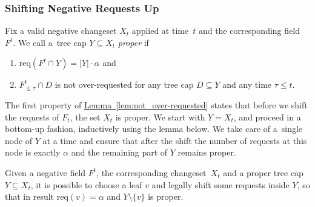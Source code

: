 \documentclass[sigconf,screen=true]{acmart}
\newcommand{\lref}[2][]{\hyperref[#2]{#1~\ref*{#2}}}
\newcommand{\req}{\textrm{req}}
\begin{document}



\subsubsection{Shifting Negative Requests Up}
\label{sec:negative_shifting}
  
Fix a valid negative changeset $X_t$ applied at time~$t$ and the
corresponding field~$F^t$. We call a~tree cap \mbox{$Y \subseteq X_t$} \emph{proper} if
\begin{enumerate}
\item $\req(F^t \cap Y) = |Y| \cdot \alpha$ and
\item $F^t_{\leq \tau} \cap D$ is not over-requested for any tree cap $D \subseteq Y$ and any time 
$\tau \leq t$.
\end{enumerate}

The first property of \lref[Lemma]{lem:not_over-requested} states that before
we shift the requests of $F_t$, the set $X_t$ is proper.  We start with $Y =
X_t$, and proceed in a bottom-up fashion, inductively using the lemma below.
We take care of a~single node of $Y$ at a time and ensure that after the shift
the number of requests at this node is exactly $\alpha$ and the remaining part
of $Y$ remains proper.

\begin{lemma}
\label{lem:shift_up_and_stay_proper}
Given a negative field $F^t$, the corresponding changeset~$X_t$ and 
a proper tree cap $Y \subseteq X_t$, it is possible to choose a leaf $v$ 
and legally shift some requests inside $Y$,
so that in result $\req({v}) = \alpha$ and $Y \setminus \{v\}$ is proper.
\end{lemma}
\end{document}
